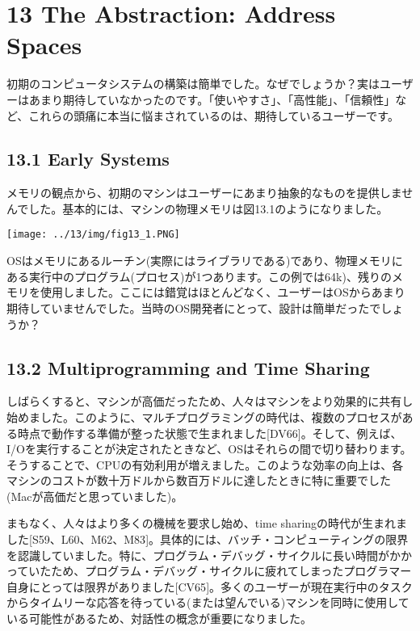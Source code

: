 \hypertarget{the-abstraction-address-spaces}{%
\section*{13 The Abstraction: Address
Spaces}\label{the-abstraction-address-spaces}}

初期のコンピュータシステムの構築は簡単でした。なぜでしょうか？実はユーザーはあまり期待していなかったのです。「使いやすさ」、「高性能」、「信頼性」など、これらの頭痛に本当に悩まされているのは、期待しているユーザーです。

\hypertarget{early-systems}{%
\subsection*{13.1 Early Systems}\label{early-systems}}

メモリの観点から、初期のマシンはユーザーにあまり抽象的なものを提供しませんでした。基本的には、マシンの物理メモリは図13.1のようになりました。

\texttt{[image: ../13/img/fig13\_1.PNG]}

OSはメモリにあるルーチン(実際にはライブラリである)であり、物理メモリにある実行中のプログラム(プロセス)が1つあります。この例では64k)、残りのメモリを使用しました。ここには錯覚はほとんどなく、ユーザーはOSからあまり期待していませんでした。当時のOS開発者にとって、設計は簡単だったでしょうか？

\hypertarget{multiprogramming-and-time-sharing}{%
\subsection*{13.2 Multiprogramming and Time
Sharing}\label{multiprogramming-and-time-sharing}}

しばらくすると、マシンが高価だったため、人々はマシンをより効果的に共有し始めました。このように、マルチプログラミングの時代は、複数のプロセスがある時点で動作する準備が整った状態で生まれました{[}DV66{]}。そして、例えば、I/Oを実行することが決定されたときなど、OSはそれらの間で切り替わります。そうすることで、CPUの有効利用が増えました。このような効率の向上は、各マシンのコストが数十万ドルから数百万ドルに達したときに特に重要でした(Macが高価だと思っていました)。

まもなく、人々はより多くの機械を要求し始め、time
sharingの時代が生まれました{[}S59、L60、M62、M83{]}。具体的には、バッチ・コンピューティングの限界を認識していました。特に、プログラム・デバッグ・サイクルに長い時間がかかっていたため、プログラム・デバッグ・サイクルに疲れてしまったプログラマー自身にとっては限界がありました{[}CV65{]}。多くのユーザーが現在実行中のタスクからタイムリーな応答を待っている(または望んでいる)マシンを同時に使用している可能性があるため、対話性の概念が重要になりました。

